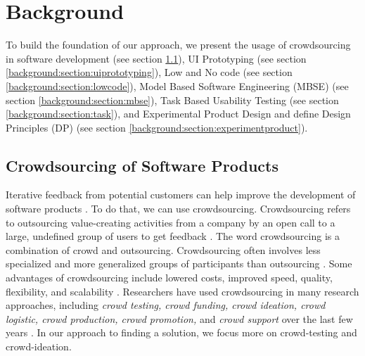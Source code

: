 
\chapter{Background}
\ifpdf
    \graphicspath{{Chapters/Background/Figs/}{Chapters/Background/Figs/}{Chapters/Background/Figs/}}
\else
    \graphicspath{{Chapters/Background/Figs/}{Chapters/Background/Figs/}}
\fi
To build the foundation of our approach, we present the usage of crowdsourcing in software development (see section \ref{background:section:crowdsourcing}), UI Prototyping (see section \ref{background:section:uiprototyping}), Low and No code (see section \ref{background:section:lowcode}), Model Based Software Engineering (MBSE) (see section \ref{background:section:mbse}), Task Based Usability Testing (see section \ref{background:section:task}), and Experimental Product Design and define Design Principles (DP) (see section \ref{background:section:experimentproduct}).
\section{Crowdsourcing of Software Products}
\label{background:section:crowdsourcing}
Iterative feedback from potential customers can help improve the development of software products \cite{article:lean:eric}.
To do that, we can use crowdsourcing.
Crowdsourcing refers to outsourcing value-creating activities from a company by an open call to a large, undefined group of users to get feedback \cite{article:crowdsourcing:leimeister}.
The word crowdsourcing is a combination of crowd and outsourcing.
Crowdsourcing often involves less specialized and more generalized groups of participants than outsourcing \cite{article:crowdsourcing:estelles}.
Some advantages of crowdsourcing include lowered costs, improved speed, quality, flexibility, and scalability \cite{article:crowdsourcing:prpic}.
Researchers have used crowdsourcing in many research approaches, including \textit{crowd testing, crowd funding, crowd ideation, crowd logistic, crowd production, crowd promotion,} and \textit{crowd support} over the last few years \cite{article:crowdsourcing:durward}.
In our approach to finding a solution, we focus more on crowd-testing and crowd-ideation.

